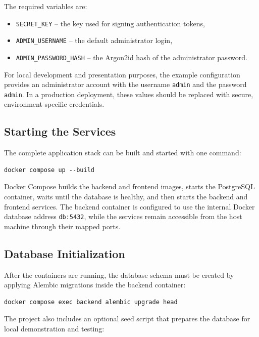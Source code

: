 The required variables are:

\begin{itemize}
    \item \texttt{SECRET\_KEY} -- the key used for signing authentication tokens,
    \item \texttt{ADMIN\_USERNAME} -- the default administrator login,
    \item \texttt{ADMIN\_PASSWORD\_HASH} -- the Argon2id hash of the administrator password.
\end{itemize}

For local development and presentation purposes, the example configuration provides an administrator account with the username \texttt{admin} and the password \texttt{admin}. In a production deployment, these values should be replaced with secure, environment-specific credentials.

\subsection{Starting the Services}

The complete application stack can be built and started with one command:

\begin{verbatim}
docker compose up --build
\end{verbatim}

Docker Compose builds the backend and frontend images, starts the PostgreSQL container, waits until the database is healthy, and then starts the backend and frontend services. The backend container is configured to use the internal Docker database address \texttt{db:5432}, while the services remain accessible from the host machine through their mapped ports.

\subsection{Database Initialization}

After the containers are running, the database schema must be created by applying Alembic migrations inside the backend container:

\begin{verbatim}
docker compose exec backend alembic upgrade head
\end{verbatim}

The project also includes an optional seed script that prepares the database for local demonstration and testing:

